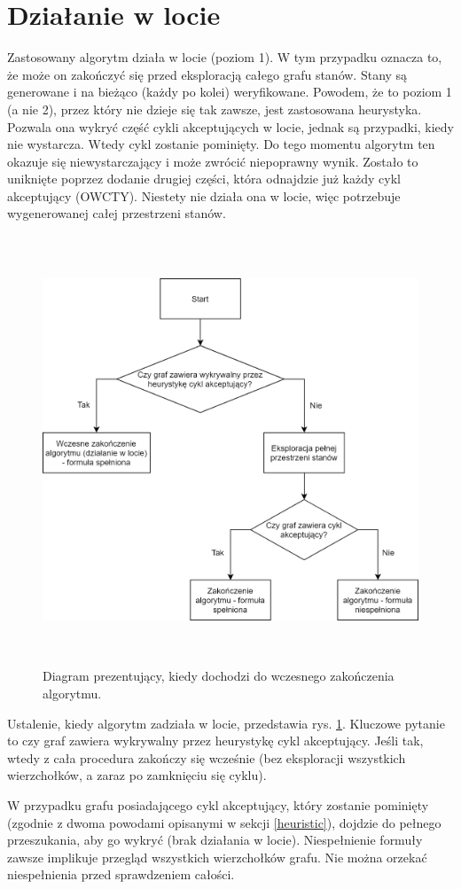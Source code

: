 \newpage
\section{Działanie w locie}

Zastosowany algorytm działa w locie (poziom 1).
W tym przypadku oznacza to, że może on zakończyć się przed eksploracją całego grafu stanów.
Stany są generowane i na bieżąco (każdy po kolei) weryfikowane.
Powodem, że to poziom 1 (a nie 2), przez który nie dzieje się tak zawsze, jest zastosowana heurystyka.
Pozwala ona wykryć część cykli akceptujących w locie, jednak są przypadki, kiedy nie wystarcza.
Wtedy cykl zostanie pominięty.
Do tego momentu algorytm ten okazuje się niewystarczający i może zwrócić niepoprawny wynik.
Zostało to uniknięte poprzez dodanie drugiej części, która odnajdzie już każdy cykl akceptujący (OWCTY).
Niestety nie działa ona w locie, więc potrzebuje wygenerowanej całej przestrzeni stanów.

\begin{figure}[h]
    \centering
    \includegraphics[height=12.8cm,keepaspectratio]{img/on-the-fly-diagram.png}
    \caption{Diagram prezentujący, kiedy dochodzi do wczesnego zakończenia algorytmu.}
    \label{fig:on_the_fly_diagram}
\end{figure}

Ustalenie, kiedy algorytm zadziała w locie, przedstawia rys. \ref{fig:on_the_fly_diagram}.
Kluczowe pytanie to czy graf zawiera wykrywalny przez heurystykę cykl akceptujący.
Jeśli tak, wtedy z cała procedura zakończy się wcześnie (bez eksploracji wszystkich wierzchołków, a zaraz po zamknięciu się cyklu).

W przypadku grafu posiadającego cykl akceptujący, który zostanie pominięty (zgodnie z dwoma powodami opisanymi w sekcji \ref{heuristic}), dojdzie do pełnego przeszukania, aby go wykryć (brak działania w locie).
Niespełnienie formuły zawsze implikuje przegląd wszystkich wierzchołków grafu.
Nie można orzekać niespełnienia przed sprawdzeniem całości.
